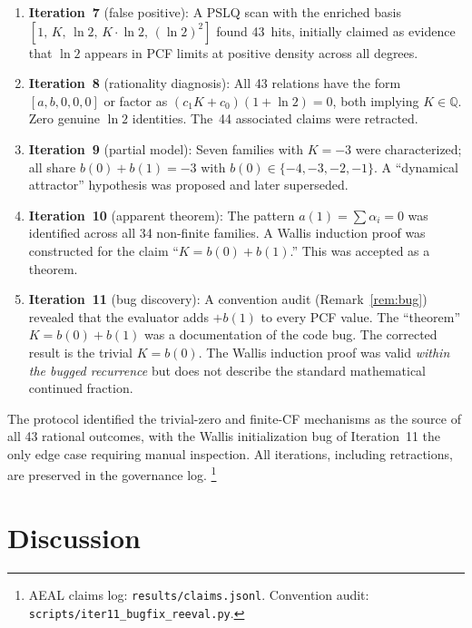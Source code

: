 \documentclass[11pt]{amsart}
\theoremstyle{definition}
\theoremstyle{remark}
\begin{document}
\begin{enumerate}
  \item \textbf{Iteration~7} (false positive):
    A PSLQ scan with the enriched basis
    $[1,\, K,\, \ln 2,\, K\!\cdot\!\ln 2,\, (\ln 2)^2]$
    found 43~hits, initially claimed as evidence that $\ln 2$
    appears in PCF limits at positive density across all degrees.

  \item \textbf{Iteration~8} (rationality diagnosis):
    All 43 relations have the form $[a, b, 0, 0, 0]$
    or factor as $(c_1 K + c_0)(1{+}\ln 2) = 0$,
    both implying $K\in\mathbb{Q}$.
    Zero genuine $\ln 2$ identities.
    The~44 associated claims were retracted.

  \item \textbf{Iteration~9} (partial model):
    Seven families with $K{=}{-}3$ were characterized;
    all share $b(0)+b(1)=-3$ with
    $b(0) \in \{-4,-3,-2,-1\}$.
    A ``dynamical attractor'' hypothesis was proposed
    and later superseded.

  \item \textbf{Iteration~10} (apparent theorem):
    The pattern $a(1) = \sum\alpha_i = 0$ was identified across all
    34 non-finite families.  A Wallis induction proof was constructed
    for the claim ``$K = b(0)+b(1)$.''  This was accepted as a theorem.

  \item \textbf{Iteration~11} (bug discovery):
    A convention audit (Remark~\ref{rem:bug}) revealed that the
    evaluator adds $+b(1)$ to every PCF value.  The ``theorem''
    $K=b(0)+b(1)$ was a documentation of the code bug.
    The corrected result is the trivial $K=b(0)$.
    The Wallis induction proof was valid \emph{within the bugged
    recurrence} but does not describe the standard mathematical
    continued fraction.
\end{enumerate}

The protocol identified the trivial-zero and finite-CF mechanisms
as the source of all 43 rational outcomes, with the Wallis
initialization bug of Iteration~11 the only edge case requiring
manual inspection.  All iterations, including retractions, are
preserved in the governance log.%
\footnote{AEAL claims log: \texttt{results/claims.jsonl}.
  Convention audit: \texttt{scripts/iter11\_bugfix\_reeval.py}.}

\section{Discussion}\label{sec:discussion}
\end{document}
